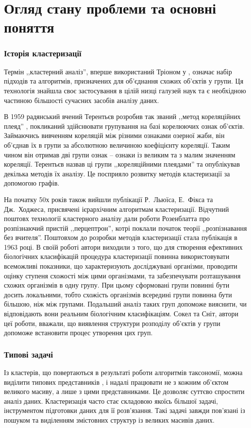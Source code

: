 \chapter{Огляд стану проблеми та основні поняття}\label{ch:01}

\subsection{Історія кластеризації}
    Термін ,,кластерний аналіз'', вперше використаний Тріоном у \cite{Tryon:Cluster:1939}, означає набір підходів та алгоритмів, призначених для об'єднання схожих об'єктів у групи. Ця технологія знайшла своє застосування в цілій низці галузей наук та є необхідною частиною більшості сучасних засобів аналізу даних.
 
    В 1959 радянський вчений Терентьєв розробив так званий ,,метод кореляційних плеяд'' \cite{Terentyev}, покликаний здійснювати групування на базі корелюючих ознак об'єктів. Займаючись вивченням кореляцій між різними ознаками озерної жаби, він об'єднав їх в групи за абсолютною величиною коефіцієнту кореляції. Таким чином він отримав дві групи ознак -- ознаки із великим та з малим значенням кореляції. Терентьєв назвав ці групи ,,кореляційними плеядами'' та опублікував декілька методів їх аналізу. Це посприяло розвитку методів кластеризації за допомогою графів.
    
    На початку 50х років також вийшли публікації Р.~Льюїса, Е.~Фікса та Дж.~Ходжеса, присвячені ієрархічним алгоритмам кластеризації. Відчутний поштовх технології кластерного аналізу дали роботи Розенблатта про розпізнаючий пристій ,,перцептрон'', котрі поклали початок теорії ,,розпізнавання без вчителя''. Поштовхом до розробки методів кластеризації стала публікація \cite{SokalSneath} в 1963 році. В своїй роботі автори виходили з того, що для створення ефективних біологічних класифікацій процедура кластеризації повинна використовувати всеможливі показники, що характеризують досліджувані організми, проводити оцінку ступеня схожості між цими організмами, та забезпечувати розташування схожих організмів в одну групу. При цьому сформовані групи повинні бути досить локальними, тобто схожість організмів всередині групи повинна бути більшою, ніж між групами. Подальший аналіз таких груп допоможе вияснити, чи відповідають вони реальним біологічним класифікаціям. Сокел та Сніт, автори цеї роботи, вважали, що виявлення структури розподілу об'єктів у групи допоможе встановити процес утворення цих груп.

\subsection{Типові задачі}
    Із кластерів, що повертаються в результаті роботи алгоритмів таксономії, можна виділити типових представників , і надалі працювати не з кожним об'єктом великого масиву, а лише з цими представниками. Це дозволяє суттєво спростити аналіз даних. Кластеризація часто стає складовою якоїсь більшої задачі, інструментом підготовки даних для її розв'язання. Такі задачі завжди пов'язані із пошуком та виділенням змістовних структур із великих масивів даних. 

